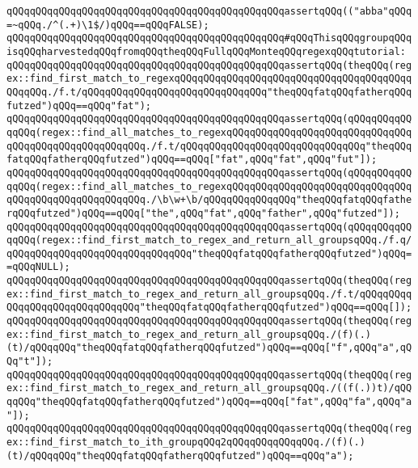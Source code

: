\verb|qQQqqQQqqQQqqQQqqQQqqQQqqQQqqQQqqQQqqQQqqQQqqQQqassertqQQq(("abba"qQQq=~qQQq./^(.+)\1$/)qQQq==qQQqFALSE);|\newline
\newline
\newline
\newline
\verb|qQQqqQQqqQQqqQQqqQQqqQQqqQQqqQQqqQQqqQQqqQQqqQQq#qQQqThisqQQqgroupqQQqisqQQqharvestedqQQqfromqQQqtheqQQqFullqQQqMonteqQQqregexqQQqtutorial:|\newline
\newline
\verb|qQQqqQQqqQQqqQQqqQQqqQQqqQQqqQQqqQQqqQQqqQQqqQQqassertqQQq(theqQQq(regex::find_first_match_to_regexqQQqqQQqqQQqqQQqqQQqqQQqqQQqqQQqqQQqqQQqqQQqqQQq./f.t/qQQqqQQqqQQqqQQqqQQqqQQqqQQqqQQq"theqQQqfatqQQqfatherqQQqfutzed")qQQq==qQQq"fat");|\newline
\verb|qQQqqQQqqQQqqQQqqQQqqQQqqQQqqQQqqQQqqQQqqQQqqQQqassertqQQq(qQQqqQQqqQQqqQQq(regex::find_all_matches_to_regexqQQqqQQqqQQqqQQqqQQqqQQqqQQqqQQqqQQqqQQqqQQqqQQqqQQqqQQq./f.t/qQQqqQQqqQQqqQQqqQQqqQQqqQQqqQQq"theqQQqfatqQQqfatherqQQqfutzed")qQQq==qQQq["fat",qQQq"fat",qQQq"fut"]);|\newline
\verb|qQQqqQQqqQQqqQQqqQQqqQQqqQQqqQQqqQQqqQQqqQQqqQQqassertqQQq(qQQqqQQqqQQqqQQq(regex::find_all_matches_to_regexqQQqqQQqqQQqqQQqqQQqqQQqqQQqqQQqqQQqqQQqqQQqqQQqqQQqqQQq./\b\w+\b/qQQqqQQqqQQqqQQq"theqQQqfatqQQqfatherqQQqfutzed")qQQq==qQQq["the",qQQq"fat",qQQq"father",qQQq"futzed"]);|\newline
\verb|qQQqqQQqqQQqqQQqqQQqqQQqqQQqqQQqqQQqqQQqqQQqqQQqassertqQQq(qQQqqQQqqQQqqQQq(regex::find_first_match_to_regex_and_return_all_groupsqQQq./f.q/qQQqqQQqqQQqqQQqqQQqqQQqqQQqqQQq"theqQQqfatqQQqfatherqQQqfutzed")qQQq==qQQqNULL);|\newline
\verb|qQQqqQQqqQQqqQQqqQQqqQQqqQQqqQQqqQQqqQQqqQQqqQQqassertqQQq(theqQQq(regex::find_first_match_to_regex_and_return_all_groupsqQQq./f.t/qQQqqQQqqQQqqQQqqQQqqQQqqQQqqQQq"theqQQqfatqQQqfatherqQQqfutzed")qQQq==qQQq[]);|\newline
\verb|qQQqqQQqqQQqqQQqqQQqqQQqqQQqqQQqqQQqqQQqqQQqqQQqassertqQQq(theqQQq(regex::find_first_match_to_regex_and_return_all_groupsqQQq./(f)(.)(t)/qQQqqQQq"theqQQqfatqQQqfatherqQQqfutzed")qQQq==qQQq["f",qQQq"a",qQQq"t"]);|\newline
\verb|qQQqqQQqqQQqqQQqqQQqqQQqqQQqqQQqqQQqqQQqqQQqqQQqassertqQQq(theqQQq(regex::find_first_match_to_regex_and_return_all_groupsqQQq./((f(.))t)/qQQqqQQq"theqQQqfatqQQqfatherqQQqfutzed")qQQq==qQQq["fat",qQQq"fa",qQQq"a"]);|\newline
\verb|qQQqqQQqqQQqqQQqqQQqqQQqqQQqqQQqqQQqqQQqqQQqqQQqassertqQQq(theqQQq(regex::find_first_match_to_ith_groupqQQq2qQQqqQQqqQQqqQQq./(f)(.)(t)/qQQqqQQq"theqQQqfatqQQqfatherqQQqfutzed")qQQq==qQQq"a");|\newline
